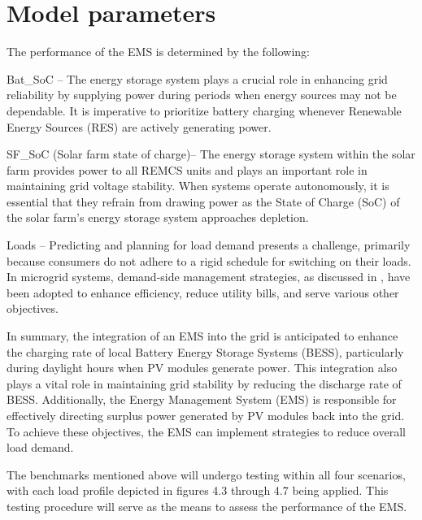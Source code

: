 \section{Model parameters}
The performance of the EMS is determined by the following:\par
Bat\_SoC – The energy storage system plays a crucial role in enhancing grid reliability by supplying power during periods when energy sources may not be dependable. It is imperative to prioritize battery charging whenever Renewable Energy Sources (RES) are actively generating power.\par
SF\_SoC (Solar farm state of charge)– The energy storage system within the solar farm provides power to all REMCS units and plays an important role in maintaining grid voltage stability. When systems operate autonomously, it is essential that they refrain from drawing power as the State of Charge (SoC) of the solar farm's energy storage system approaches depletion.\par
Loads – Predicting and planning for load demand presents a challenge, primarily because consumers do not adhere to a rigid schedule for switching on their loads. In microgrid systems, demand-side management strategies, as discussed in \cite{43}, have been adopted to enhance efficiency, reduce utility bills, and serve various other objectives.\par
In summary, the integration of an EMS into the grid is anticipated to enhance the charging rate of local Battery Energy Storage Systems (BESS), particularly during daylight hours when PV modules generate power. This integration also plays a vital role in maintaining grid stability by reducing the discharge rate of BESS. Additionally, the Energy Management System (EMS) is responsible for effectively directing surplus power generated by PV modules back into the grid. To achieve these objectives, the EMS can implement strategies to reduce overall load demand.\par
The benchmarks mentioned above will undergo testing within all four scenarios, with each load profile depicted in figures 4.3 through 4.7 being applied. This testing procedure will serve as the means to assess the performance of the EMS.
